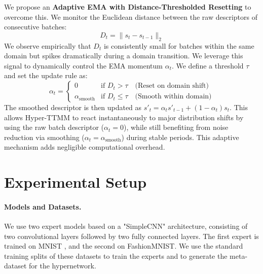 \documentclass{article}
\theoremstyle{plain}
\theoremstyle{definition}
\theoremstyle{remark}
\begin{document}
We propose an \textbf{Adaptive EMA with Distance-Thresholded Resetting} to overcome this. We monitor the Euclidean distance between the raw descriptors of consecutive batches:
\begin{equation}
D_t = \|s_t - s_{t-1}\|_2
\end{equation}
We observe empirically that $D_t$ is consistently small for batches within the same domain but spikes dramatically during a domain transition. We leverage this signal to dynamically control the EMA momentum $\alpha_t$. We define a threshold $\tau$ and set the update rule as:
\begin{equation}
\alpha_t =
\begin{cases}
    0 & \text{if } D_t > \tau \quad \text{(Reset on domain shift)} \\
    \alpha_{\text{smooth}} & \text{if } D_t \leq \tau \quad \text{(Smooth within domain)}
\end{cases}
\end{equation}
The smoothed descriptor is then updated as $s'_t = \alpha_t s'_{t-1} + (1 - \alpha_t)s_t$.
This allows Hyper-TTMM to react instantaneously to major distribution shifts by using the raw batch descriptor ($\alpha_t=0$), while still benefiting from noise reduction via smoothing ($\alpha_t=\alpha_{\text{smooth}}$) during stable periods. This adaptive mechanism adds negligible computational overhead.

\section{Experimental Setup}

\paragraph{Models and Datasets.} We use two expert models based on a "SimpleCNN" architecture, consisting of two convolutional layers followed by two fully connected layers. The first expert is trained on MNIST \citep{lecun1998gradient}, and the second on FashionMNIST. We use the standard training splits of these datasets to train the experts and to generate the meta-dataset for the hypernetwork.
\end{document}
